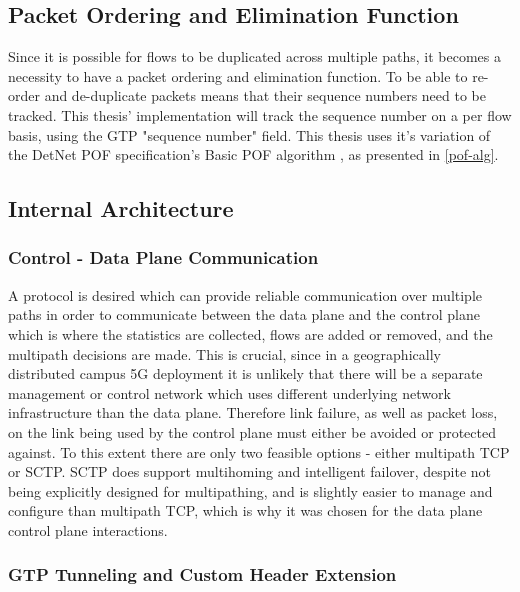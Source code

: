 \subsection{Packet Ordering and Elimination Function}

Since it is possible for flows to be duplicated across multiple paths, it becomes a necessity to have a packet ordering and elimination function. To be able to re-order and de-duplicate packets means that their sequence numbers need to be tracked. This thesis' implementation will track the sequence number on a per flow basis, using the GTP "sequence number" field. This thesis uses it's variation of the DetNet POF specification's Basic POF algorithm \cite{ietf-detnet-pof-08}, as presented in \ref{pof-alg}.

\subsection{Internal Architecture}

\subsubsection{Control - Data Plane Communication}

A protocol is desired which can provide reliable communication over multiple paths in order to communicate between the data plane and the control plane which is where the statistics are collected, flows are added or removed, and the multipath decisions are made. This is crucial, since in a geographically distributed campus 5G deployment it is unlikely that there will be a separate management or control network which uses different underlying network infrastructure than the data plane. Therefore link failure, as well as packet loss, on the link being used by the control plane must either be avoided or protected against. To this extent there are only two feasible options - either multipath TCP or SCTP. SCTP does support multihoming and intelligent failover, despite not being explicitly designed for multipathing, and is slightly easier to manage and configure than multipath TCP, which is why it was chosen for the data plane control plane interactions.

\subsubsection{GTP Tunneling and Custom Header Extension}

